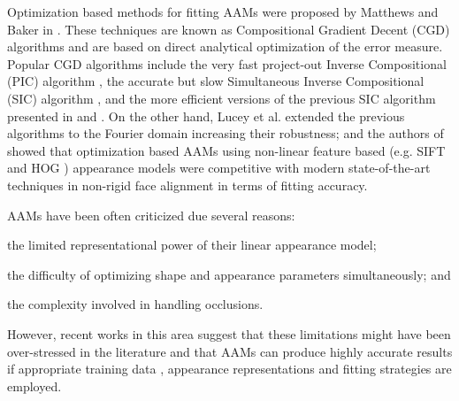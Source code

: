 Optimization based methods for fitting AAMs were proposed by Matthews and Baker in \cite{Matthews2004}. These techniques are known as Compositional Gradient Decent (CGD) algorithms and are based on direct analytical optimization of the error measure. Popular CGD algorithms include the very fast project-out Inverse Compositional (PIC) algorithm \cite{Matthews2004}, the accurate but slow Simultaneous Inverse Compositional (SIC) algorithm \cite{Gross2005}, and the more efficient versions of the previous SIC algorithm presented in \cite{Papandreou2008} and \cite{Tzimiropoulos2013}. On the other hand, Lucey et al. \cite{Lucey2013} extended the previous algorithms to the Fourier domain increasing their robustness; and the authors of \cite{Antonakos2014} showed that optimization based AAMs using non-linear feature based (e.g. SIFT\cite{Lowe1999} and HOG \cite{Dalal2005}) appearance models were competitive with modern state-of-the-art techniques in non-rigid face alignment \cite{Xiong2013, Asthana2013} in terms of fitting accuracy.

AAMs have been often criticized due several reasons: 
\begin{inparaenum} 
\item the limited representational power of their linear appearance model; 
\item the difficulty of optimizing shape and appearance parameters simultaneously; and
\item the complexity involved in handling occlusions. 
\end{inparaenum}
However, recent works in this area \cite{Papandreou2008, Saragih2009,Tresadern2010, Lucey2013, Tzimiropoulos2013, Antonakos2014} suggest that these limitations might have been over-stressed in the literature and that AAMs can produce highly accurate results if appropriate training data \cite{Tzimiropoulos2013}, appearance representations \cite{Tresadern2010, Lucey2013, Antonakos2014} and fitting strategies \cite{Papandreou2008, Saragih2009, Tresadern2010, Tzimiropoulos2013} are employed.

